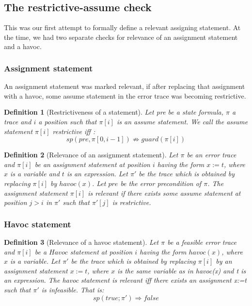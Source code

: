 \documentclass{article}
\newcommand{\limp}{\Rightarrow}
\newtheorem{mydef}{Definition}
\begin{document}
\subsection{The restrictive-assume check}
This was our first attempt to formally define a relevant assigning statement. At the time, we had two separate checks for relevance of an assignment statement and a havoc.
\subsubsection{Assignment statement}
An assignment statement was marked relevant, if after replacing that assignment with a havoc, some assume statement in the error trace was becoming restrictive.
\begin{mydef}[Restrictiveness of a statement]
Let \emph{pre} be a state formula, $\pi$ a trace and $i$ a position such that $\pi[i]$ is an assume statement. We call the assume statement $\pi[i]$ \emph{restrictive} iff :
$$sp(pre, \pi[0,i-1]) \not \limp guard(\pi[i])$$
\end{mydef}

\begin{mydef}[Relevance of an assignment statement]
Let $\pi$ be an error trace and $\pi[i]$ be an assignment statement at position $i$ having the form $x:=t$, where $x$ is a variable and $t$ is an expression. Let $\pi'$ be the trace which is obtained by replacing $\pi[i]$ by  $havoc(x)$. Let $pre$ be the error precondition of $\pi$. The assignment statement $\pi[i]$ is \emph{relevant} if there exists some assume statement at position $j > i$ in $\pi'$ such that $\pi'[j]$ is restrictive. 
\end{mydef}

\subsubsection{Havoc statement}
\begin{mydef}[Relevance of a havoc statement]
Let $\pi$ be a feasible error trace and $\pi[i]$ be a $Havoc$ statement at position $i$ having the form $havoc(x)$, where $x$ is a variable. Let $\pi'$ be the trace which is obtained by replacing $\pi[i]$ by an assignment statement $x:=t$, where $x$ is the same variable as in havoc(x) and t is an expression. The havoc statement is \emph{relevant} iff there exists an assignment x:=t such that $\pi'$ is infeasible. That is:
$$sp(true; \pi') \Rightarrow false$$
\end{mydef}
\end{document}
